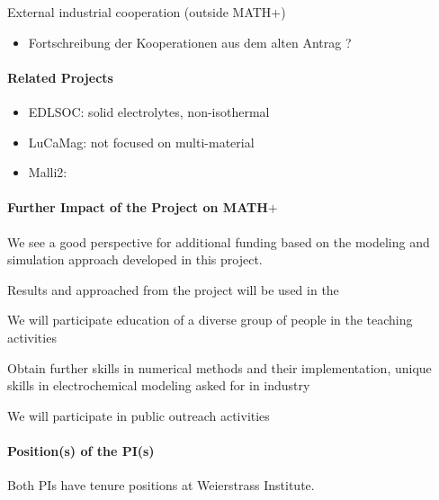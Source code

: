 \documentclass[a4paper,10pt]{article}
\begin{document}
External industrial cooperation (outside MATH+)
\begin{itemize}
\item Fortschreibung der Kooperationen aus dem alten Antrag ?
\end{itemize}

\paragraph{Related Projects}
\begin{itemize}
\item EDLSOC: solid electrolytes, non-isothermal
\item LuCaMag: not focused on multi-material
\item Malli2: 
\end{itemize}

\paragraph{Further Impact of the Project on MATH$+$}
We see a good perspective for additional funding based on the modeling and simulation approach
developed in this project.

Results and approached from the project will be used in the 

We will participate education of a diverse group of people in the teaching activities

Obtain further skills in numerical methods and their implementation, unique skills in electrochemical
modeling asked for in  industry

We will participate in public outreach activities

\paragraph{Position(s) of the PI(s)}
Both PIs have tenure positions at Weierstrass Institute.
\end{document}
